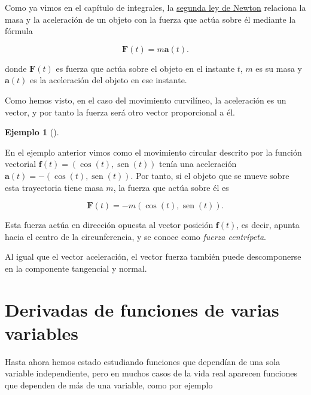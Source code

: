 \documentclass[
  a4paper,
]{scrreport}
\theoremstyle{plain}
\theoremstyle{plain}
\theoremstyle{definition}
\theoremstyle{definition}
\newtheorem{example}{Ejemplo}[chapter]
\theoremstyle{plain}
\theoremstyle{definition}
\theoremstyle{remark}
\begin{document}
Como ya vimos en el capítulo de integrales, la
\href{https://es.wikipedia.org/wiki/Leyes_de_Newton\#Segunda_ley_de_Newton_o_ley_fundamental_de_la_din\%C3\%A1mica}{segunda
ley de Newton} relaciona la masa y la aceleración de un objeto con la
fuerza que actúa sobre él mediante la fórmula

\[
\mathbf{F}(t) = m\mathbf{a}(t).
\]

donde \(\mathbf{F}(t)\) es fuerza que actúa sobre el objeto en el
instante \(t\), \(m\) es su masa y \(\mathbf{a}(t)\) es la aceleración
del objeto en ese instante.

Como hemos visto, en el caso del movimiento curvilíneo, la aceleración
es un vector, y por tanto la fuerza será otro vector proporcional a él.

\begin{example}[]\protect\hypertarget{exm-fuerza-centrípeta}{}\label{exm-fuerza-centrípeta}

En el ejemplo anterior vimos como el movimiento circular descrito por la
función vectorial \(\mathbf{f}(t) = (\cos(t),\operatorname{sen}(t))\)
tenía una aceleración
\(\mathbf{a}(t) = -(\cos(t), \operatorname{sen}(t))\). Por tanto, si el
objeto que se mueve sobre esta trayectoria tiene masa \(m\), la fuerza
que actúa sobre él es

\[
\mathbf{F}(t) = -m(\cos(t), \operatorname{sen}(t)).
\]

Esta fuerza actúa en dirección opuesta al vector posición
\(\mathbf{f}(t)\), es decir, apunta hacia el centro de la
circunferencia, y se conoce como \emph{fuerza centrípeta}.

\end{example}

Al igual que el vector aceleración, el vector fuerza también puede
descomponerse en la componente tangencial y normal.


\hypertarget{derivadas-de-funciones-de-varias-variables}{%
\chapter{Derivadas de funciones de varias
variables}\label{derivadas-de-funciones-de-varias-variables}}

Hasta ahora hemos estado estudiando funciones que dependían de una sola
variable independiente, pero en muchos casos de la vida real aparecen
funciones que dependen de más de una variable, como por ejemplo
\end{document}
